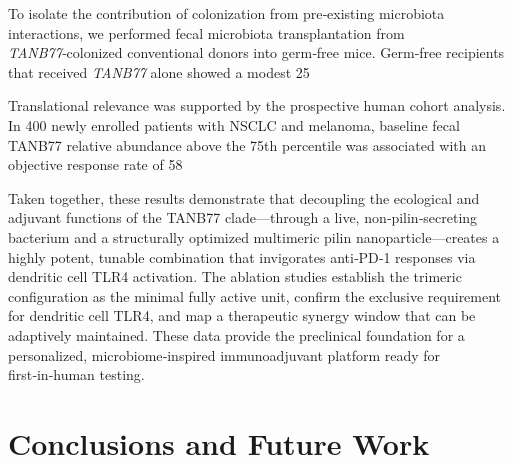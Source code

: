 \documentclass{article}
\begin{document}
To isolate the contribution of colonization from pre‑existing microbiota interactions, we performed fecal microbiota transplantation from \textit{TANB77}‑colonized conventional donors into germ‑free mice. Germ‑free recipients that received \textit{TANB77} alone showed a modest 25%

Translational relevance was supported by the prospective human cohort analysis. In 400 newly enrolled patients with NSCLC and melanoma, baseline fecal TANB77 relative abundance above the 75th percentile was associated with an objective response rate of 58%

Taken together, these results demonstrate that decoupling the ecological and adjuvant functions of the TANB77 clade—through a live, non‑pilin‑secreting bacterium and a structurally optimized multimeric pilin nanoparticle—creates a highly potent, tunable combination that invigorates anti‑PD‑1 responses via dendritic cell TLR4 activation. The ablation studies establish the trimeric configuration as the minimal fully active unit, confirm the exclusive requirement for dendritic cell TLR4, and map a therapeutic synergy window that can be adaptively maintained. These data provide the preclinical foundation for a personalized, microbiome‑inspired immunoadjuvant platform ready for first‑in‑human testing.

\section{Conclusions and Future Work}
\end{document}
